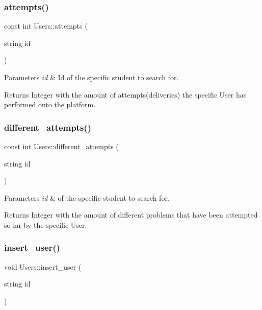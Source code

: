 \subsubsection{\texorpdfstring{attempts()}{attempts()}}
{\footnotesize\ttfamily const int Users\+::attempts (\begin{DoxyParamCaption}\item[{string}]{id }\end{DoxyParamCaption})}


\begin{DoxyParams}{Parameters}
{\em id} & Id of the specific student to search for. \\
\hline
\end{DoxyParams}
\begin{DoxyReturn}{Returns}
Integer with the amount of attempts(deliveries) the specific User has performed onto the platform. 
\end{DoxyReturn}
\mbox{\label{classUsers_a6c11a0a42c97de1fdcdf077d9c0a5997}} 
\subsubsection{\texorpdfstring{different\+\_\+attempts()}{different\_attempts()}}
{\footnotesize\ttfamily const int Users\+::different\+\_\+attempts (\begin{DoxyParamCaption}\item[{string}]{id }\end{DoxyParamCaption})}


\begin{DoxyParams}{Parameters}
{\em id} & of the specific student to search for. \\
\hline
\end{DoxyParams}
\begin{DoxyReturn}{Returns}
Integer with the amount of different problems that have been attempted so far by the specific User. 
\end{DoxyReturn}
\mbox{\label{classUsers_ab406dbc4d4c6c3d333be0b1e5d149ea4}} 
\subsubsection{\texorpdfstring{insert\+\_\+user()}{insert\_user()}}
{\footnotesize\ttfamily void Users\+::insert\+\_\+user (\begin{DoxyParamCaption}\item[{string}]{id }\end{DoxyParamCaption})}

